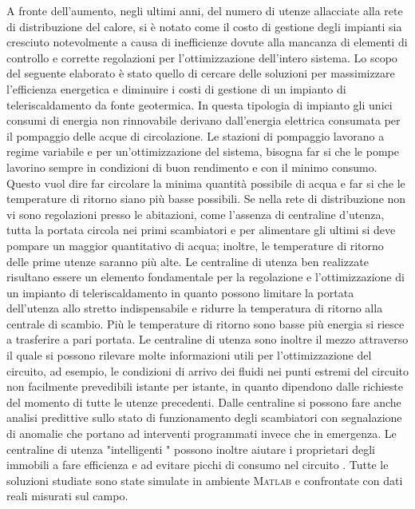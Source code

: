 \documentclass[laurea,oneside,11pt]{USiena_tesiLM3}
\begin{document}
A fronte dell'aumento, negli ultimi anni, del numero di utenze allacciate alla rete di distribuzione del calore, si è notato come il costo di gestione degli impianti sia cresciuto notevolmente a causa di inefficienze dovute alla mancanza di elementi di controllo e corrette regolazioni per l'ottimizzazione dell'intero sistema.
Lo scopo del seguente elaborato è stato quello di cercare delle soluzioni per massimizzare l'efficienza energetica e diminuire i costi di gestione di un impianto di teleriscaldamento da fonte geotermica. In questa tipologia di impianto gli unici consumi di energia non rinnovabile  derivano dall'energia elettrica consumata  per il pompaggio delle acque di circolazione. 
Le stazioni di pompaggio lavorano a regime variabile e per un'ottimizzazione del sistema, bisogna far si che le pompe lavorino sempre in condizioni di buon rendimento e con il minimo consumo. Questo vuol dire far circolare la minima quantità possibile di acqua e far si che le temperature di ritorno siano più basse possibili. Se nella rete di distribuzione non vi sono regolazioni presso le abitazioni, come l'assenza di centraline d'utenza, tutta la portata circola nei primi scambiatori e per alimentare gli ultimi si deve pompare un maggior quantitativo di acqua; inoltre, le temperature di ritorno delle prime utenze saranno più alte. Le centraline di utenza ben realizzate risultano essere un elemento fondamentale per la regolazione e l'ottimizzazione di un impianto di teleriscaldamento in quanto possono  limitare la portata dell'utenza allo stretto indispensabile e ridurre la temperatura di ritorno alla centrale di scambio. Più le temperature di ritorno sono basse più energia si riesce a trasferire a pari portata. Le centraline di utenza sono inoltre il mezzo attraverso il quale si possono rilevare molte informazioni utili per l'ottimizzazione del circuito, ad esempio, le condizioni di arrivo dei fluidi nei punti estremi del circuito non facilmente prevedibili istante per istante, in quanto dipendono dalle richieste del momento di tutte le utenze precedenti.
Dalle centraline si possono fare anche analisi predittive sullo stato di funzionamento degli scambiatori con segnalazione di anomalie che portano ad interventi programmati invece che in emergenza.
Le centraline di utenza "intelligenti " possono inoltre aiutare i proprietari degli immobili a fare efficienza e ad evitare picchi di consumo nel circuito .
Tutte le soluzioni studiate sono state simulate in ambiente \textsc{Matlab} e confrontate con dati reali misurati sul campo.\\
\end{document}
